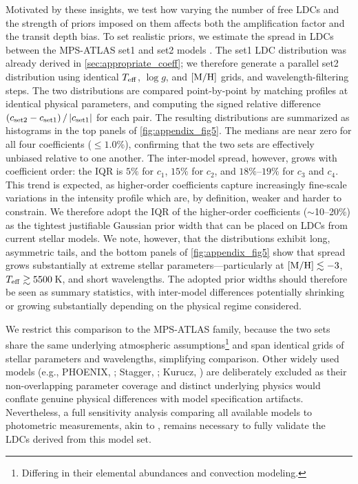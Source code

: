 \documentclass[twocolumn]{aastex631}
\begin{document}
Motivated by these insights, we test how varying the number of free LDCs and the strength of priors imposed on them affects both the amplification factor and the transit depth bias. To set realistic priors, we estimate the spread in LDCs between the MPS-ATLAS set1 and set2 models \citep{mpsset1,mpsset2}. The set1 LDC distribution was already derived in \autoref{sec:appropriate_coeff}; we therefore generate a parallel set2 distribution using identical $T_{\rm eff}$, $\log g$, and $[{\rm M/H}]$ grids, and wavelength-filtering steps. The two distributions are compared point-by-point by matching profiles at identical physical parameters, and computing the signed relative difference $(c_{\rm set2} - c_{\rm set1})\,/\,|c_{\rm set1}|$ for each pair. The resulting distributions are summarized as histograms in the top panels of \autoref{fig:appendix_fig5}. The medians are near zero for all four coefficients ($\leq1.0\%$), confirming that the two sets are effectively unbiased relative to one another. The inter-model spread, however, grows with coefficient order: the IQR is $5\%$ for $c_1$, $15\%$ for $c_2$, and $18\%$--$19\%$ for $c_3$ and $c_4$. This trend is expected, as higher-order coefficients capture increasingly fine-scale variations in the intensity profile which are, by definition, weaker and harder to constrain. We therefore adopt the IQR of the higher-order coefficients ($\sim$10--20\%) as the tightest justifiable Gaussian prior width that can be placed on LDCs from current stellar models. We note, however, that the distributions exhibit long, asymmetric tails, and the bottom panels of \autoref{fig:appendix_fig5} show that spread grows substantially at extreme stellar parameters---particularly at $[{\rm M/H}] \lesssim -3$, $T_{\rm eff} \gtrsim 5500$\,K, and short wavelengths. The adopted prior widths should therefore be seen as summary statistics, with inter-model differences potentially shrinking or growing substantially depending on the physical regime considered.

We restrict this comparison to the MPS-ATLAS family, because the two sets share the same underlying atmospheric assumptions\footnote{Differing in their elemental abundances and convection modeling.} and span identical grids of stellar parameters and wavelengths, simplifying comparison. Other widely used models (e.g., PHOENIX, \citealt{Husser2013}; Stagger, \citealt{Magic2013}; Kurucz, \citealt{Kurucz1979}) are deliberately excluded as their non-overlapping parameter coverage and distinct underlying physics would conflate genuine physical differences with model specification artifacts. Nevertheless, a full sensitivity analysis comparing all available models to photometric measurements, akin to , remains necessary to fully validate the LDCs derived from this model set. %
\end{document}
